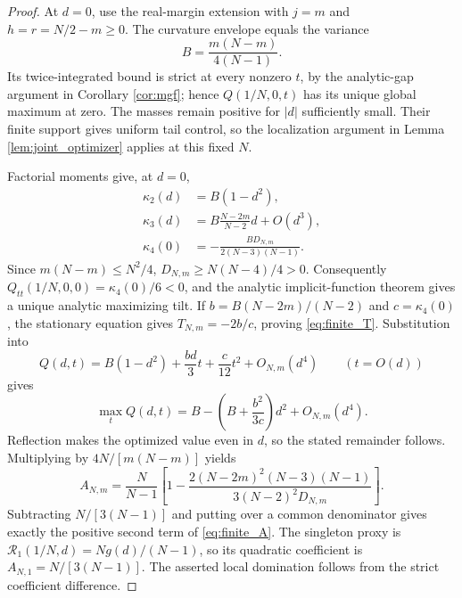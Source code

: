 \begin{proof}
At $d=0$, use the real-margin extension with $j=m$ and $h=r=N/2-m\ge0$. The curvature envelope equals the variance
\[
 B=\frac{m(N-m)}{4(N-1)}.
\]
Its twice-integrated bound is strict at every nonzero $t$, by the analytic-gap argument in Corollary \ref{cor:mgf}; hence $Q(1/N,0,t)$ has its unique global maximum at zero. The masses remain positive for $|d|$ sufficiently small. Their finite support gives uniform tail control, so the localization argument in Lemma \ref{lem:joint_optimizer} applies at this fixed $N$.

Factorial moments give, at $d=0$,
\begin{align*}
 \kappa_2(d)&=B(1-d^2),\\
 \kappa_3(d)&=B\frac{N-2m}{N-2}d+O(d^3),\\
 \kappa_4(0)&=-\frac{BD_{N,m}}{2(N-3)(N-1)}.
\end{align*}
Since $m(N-m)\le N^2/4$, $D_{N,m}\ge N(N-4)/4>0$. Consequently $Q_{tt}(1/N,0,0)=\kappa_4(0)/6<0$, and the analytic implicit-function theorem gives a unique analytic maximizing tilt. If $b=B(N-2m)/(N-2)$ and $c=\kappa_4(0)$, the stationary equation gives $T_{N,m}=-2b/c$, proving \eqref{eq:finite_T}. Substitution into
\[
 Q(d,t)=B(1-d^2)+\frac{bd}{3}t+\frac c{12}t^2
 +O_{N,m}(d^4)\qquad(t=O(d))
\]
gives
\[
 \max_tQ(d,t)=B-\left(B+\frac{b^2}{3c}\right)d^2+O_{N,m}(d^4).
\]
Reflection makes the optimized value even in $d$, so the stated remainder follows. Multiplying by $4N/[m(N-m)]$ yields
\[
 A_{N,m}=\frac N{N-1}\left[
 1-\frac{2(N-2m)^2(N-3)(N-1)}{3(N-2)^2D_{N,m}}\right].
\]
Subtracting $N/[3(N-1)]$ and putting over a common denominator gives exactly the positive second term of \eqref{eq:finite_A}. The singleton proxy is $\mathcal R_1(1/N,d)=N g(d)/(N-1)$, so its quadratic coefficient is $A_{N,1}=N/[3(N-1)]$. The asserted local domination follows from the strict coefficient difference.
\end{proof}
